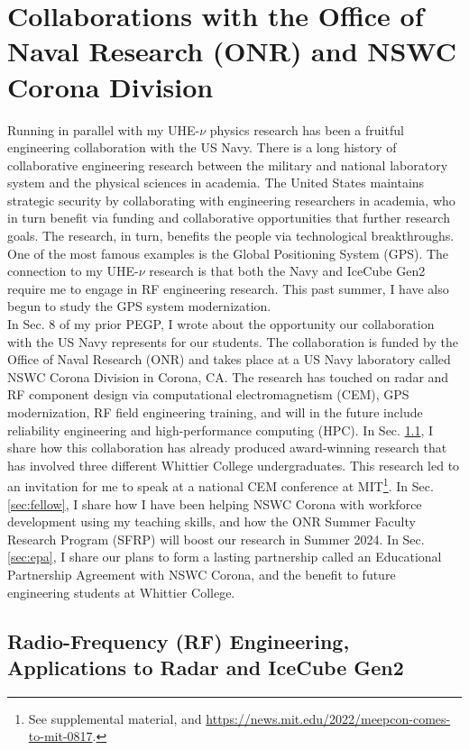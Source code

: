\documentclass[../../../main.tex]{subfiles}
\begin{document}
\section{Collaborations with the Office of Naval Research (ONR) and NSWC Corona Division}
\label{sec:naval_research}

Running in parallel with my UHE-$\nu$ physics research has been a fruitful engineering collaboration with the US Navy.  There is a long history of collaborative engineering research between the military and national laboratory system and the physical sciences in academia.  The United States maintains strategic security by collaborating with engineering researchers in academia, who in turn benefit via funding and collaborative opportunities that further research goals.  The research, in turn, benefits the people via technological breakthroughs.  One of the most famous examples is the Global Positioning System (GPS).  The connection to my UHE-$\nu$ research is that both the Navy and IceCube Gen2 require me to engage in RF engineering research.  This past summer, I have also begun to study the GPS system modernization.
\\
\vspace{0.15cm}
In Sec. 8 of my prior PEGP, I wrote about the opportunity our collaboration with the US Navy represents for our students.  The collaboration is funded by the Office of Naval Research (ONR) and takes place at a US Navy laboratory called NSWC Corona Division in Corona, CA.  The research has touched on radar and RF component design via computational electromagnetism (CEM), GPS modernization, RF field engineering training, and will in the future include reliability engineering and high-performance computing (HPC).  In Sec. \ref{sec:cem_paper}, I share how this collaboration has already produced award-winning research that has involved three different Whittier College undergraduates.  This research led to an invitation for me to speak at a national CEM conference at MIT\footnote{See supplemental material, and \url{https://news.mit.edu/2022/meepcon-comes-to-mit-0817}.}.  In Sec. \ref{sec:fellow}, I share how I have been helping NSWC Corona with workforce development using my teaching skills, and how the ONR Summer Faculty Research Program (SFRP) will boost our research in Summer 2024.  In Sec. \ref{sec:epa}, I share our plans to form a lasting partnership called an Educational Partnership Agreement with NSWC Corona, and the benefit to future engineering students at Whittier College.

\subsection{Radio-Frequency (RF) Engineering, Applications to Radar and IceCube Gen2}
\label{sec:cem_paper}
\end{document}
